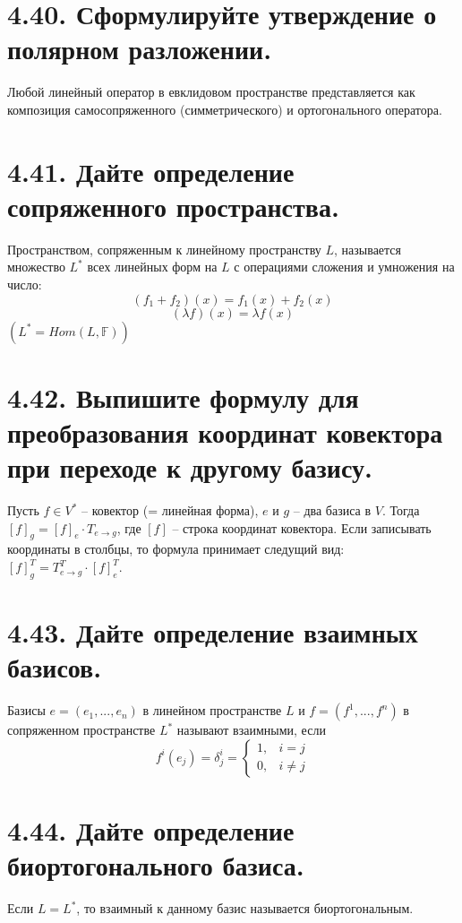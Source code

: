 \documentclass{article}
\begin{document}
\section*{\LARGE 4.40. Сформулируйте утверждение о полярном разложении.}
Любой линейный оператор в евклидовом пространстве представляется как композиция самосопряженного (симметрического) и ортогонального оператора. 

\section*{\LARGE 4.41. Дайте определение сопряженного пространства.}
Пространством, сопряженным к линейному пространству $L$, называется множество $L^*$ всех линейных форм на $L$ с операциями сложения и умножения на число:
$$(f_1 + f_2)(x) = f_1(x) + f_2(x)$$
$$(\lambda f)(x) = \lambda f(x)$$
$(L^* = Hom(L, \mathbb{F}))$

\section*{\LARGE 4.42. Выпишите формулу для преобразования координат ковектора при переходе к другому базису.}
Пусть $f \in V^*$ -- ковектор (= линейная форма), $e$ и $g$ -- два базиса в $V$. Тогда $[f]_g = [f]_e \cdot T_{e \rightarrow g}$, где $[f]$ -- строка координат ковектора. Если записывать координаты в столбцы, то формула принимает следущий вид: $[f]_g^T = T_{e \rightarrow g}^T \cdot [f]_e^T$.

\section*{\LARGE 4.43. Дайте определение взаимных базисов.}
Базисы $e = (e_1, ... , e_n)$ в линейном пространстве $L$ и $f = (f^1, ... , f^n)$ в сопряженном пространстве $L^*$ называют взаимными, если
$$
f^i(e_j) = \delta_j^i = 
\begin{cases}
1, & i = j \\
0, & i \ne j
\end{cases}
$$

\section*{\LARGE 4.44. Дайте определение биортогонального базиса.}
Если $L = L^*$, то взаимный к данному базис называется биортогональным.
\end{document}
